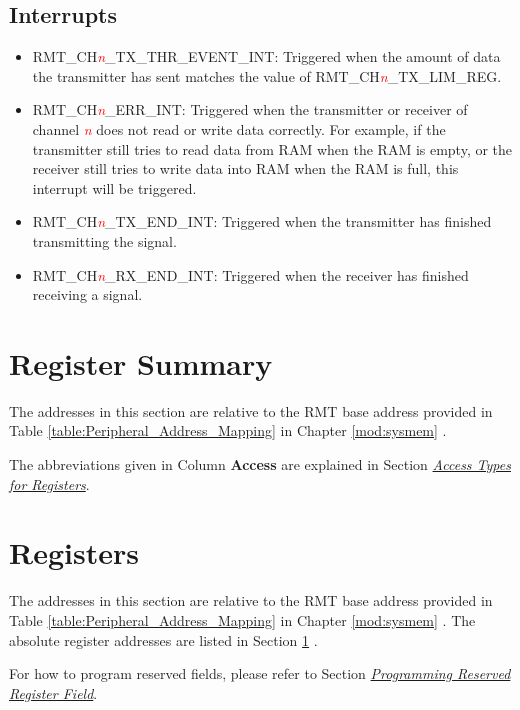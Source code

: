 \documentclass[main\_\_EN.tex]{subfiles}
\begin{document}
\subsection{Interrupts}
\begin{itemize}
\item \label{int:RMTCHnTXTHREVENTINT}RMT\_CH\textcolor{red}{\it{n}}\_TX\_THR\_EVENT\_INT: Triggered when the amount of data the transmitter has sent matches the value of RMT\_CH\textcolor{red}{\it{n}}\_TX\_LIM\_REG.
\item \label{int:RMTCHnERRINT}RMT\_CH\textcolor{red}{\it{n}}\_ERR\_INT: Triggered when the transmitter or receiver of channel \textcolor{red}{\it{n}} does not read or write data correctly. For example, if the transmitter still tries to read data from RAM when the RAM is empty, or the receiver still tries to write data into RAM when the RAM is full, this interrupt will be triggered.
\item \label{int:RMTCHnTXENDINT}RMT\_CH\textcolor{red}{\it{n}}\_TX\_END\_INT: Triggered when the transmitter has finished transmitting the signal.
\item \label{int:RMTCHnRXENDINT}RMT\_CH\textcolor{red}{\it{n}}\_RX\_END\_INT: Triggered when the receiver has finished receiving a signal.
\end{itemize}

\hypertarget{rmt-reg-summ}{}
\section{Register Summary}\label{sec:rmt-reg-summ}

The addresses in this section are relative to the RMT base address provided in Table \ref{table:Peripheral_Address_Mapping} in Chapter \ref{mod:sysmem} \textit{}.

The abbreviations given in Column \textbf{Access} are explained in Section \hyperref[glossary-access-types]{\textit{Access Types for Registers}}.




\section{Registers}

The addresses in this section are relative to the RMT base address provided in Table \ref{table:Peripheral_Address_Mapping} in Chapter \ref{mod:sysmem} \textit{}. The absolute register addresses are listed in Section \ref{sec:rmt-reg-summ} \textit{}.

For how to program reserved fields, please refer to Section \hyperref[programming-reserved-field]{\textit{Programming Reserved Register Field}}.


\end{document}
